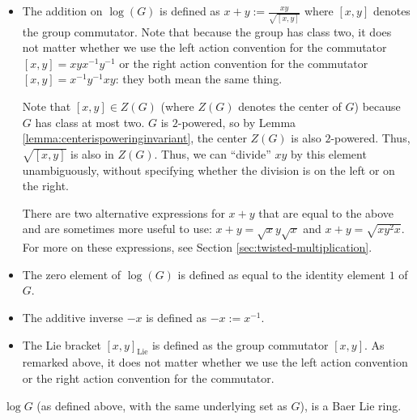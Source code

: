 \documentclass{ucetd}
\begin{document}
\begin{itemize}
\item The addition on $\log(G)$ is defined as $x + y :=
  \frac{xy}{\sqrt{[x,y]}}$ where $[x,y]$ denotes the group
  commutator. Note that because the group has class two, it does not
  matter whether we use the left action convention for the commutator
  $[x,y] = xyx^{-1}y^{-1}$ or the right action convention for the
  commutator $[x,y] = x^{-1}y^{-1}xy$: they both mean the same thing.

  Note that $[x,y] \in Z(G)$ (where $Z(G)$ denotes the center of $G$)
  because $G$ has class at most two. $G$ is $2$-powered, so by Lemma
  \ref{lemma:centerispoweringinvariant}, the center $Z(G)$ is also
  $2$-powered. Thus, $\sqrt{[x,y]}$ is also in $Z(G)$. Thus, we can
  ``divide'' $xy$ by this element unambiguously, without specifying
  whether the division is on the left or on the right.

  There are two alternative expressions for $x + y$ that are equal to
  the above and are sometimes more useful to use: $x + y =
  \sqrt{x}y\sqrt{x}$ and $x + y = \sqrt{xy^2x}$. For more on these
  expressions, see Section \ref{sec:twisted-multiplication}.
\item The zero element of $\log(G)$ is defined as equal to the
  identity element $1$ of $G$.
\item The additive inverse $-x$ is defined as $-x := x^{-1}$.
\item The Lie bracket $[x,y]_{\text{Lie}}$ is defined as the group
  commutator $[x,y]$. As remarked above, it does not matter whether we
  use the left action convention or the right action convention for
  the commutator.
\end{itemize}

\begin{lemma}
  $\log G$ (as defined above, with the same underlying set as $G$), is
  a Baer Lie ring.
\end{lemma}
\end{document}
